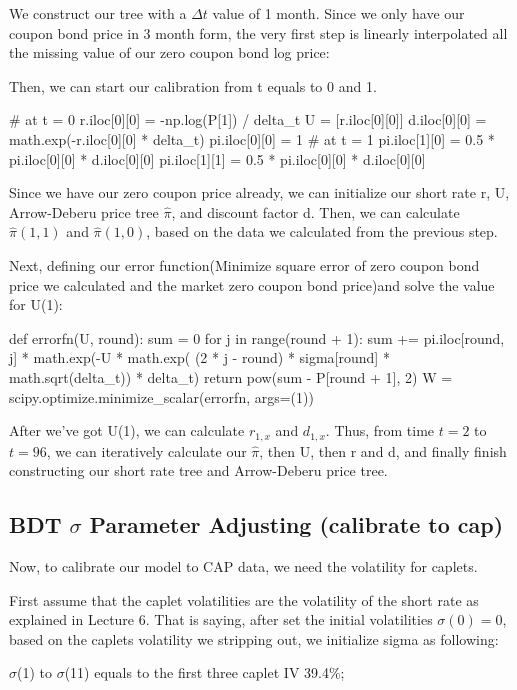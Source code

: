 \documentclass[paper = letterpaper, fontsize=12pt]{article}
\begin{document}
We construct our tree with a $\Delta t$ value of 1 month. Since we only have our coupon bond price in 3 month form, the very first step is linearly interpolated all the missing value of our zero coupon bond log price:
 

 Then, we can start our calibration from t equals to 0 and 1.
\begin{python}
# at t = 0
r.iloc[0][0] = -np.log(P[1]) / delta_t
U = [r.iloc[0][0]]
d.iloc[0][0] = math.exp(-r.iloc[0][0] * delta_t)
pi.iloc[0][0] = 1
# at t = 1
pi.iloc[1][0] = 0.5 * pi.iloc[0][0] * d.iloc[0][0]
pi.iloc[1][1] = 0.5 * pi.iloc[0][0] * d.iloc[0][0]
\end{python}

Since we have our zero coupon price already, we can initialize our short rate r, U, Arrow-Deberu price tree $\hat{\pi}$, and discount factor d. Then, we can calculate $\hat{\pi}(1,1)$ and $\hat{\pi}(1, 0)$, based on the data we calculated from the previous step. 

Next, defining our error function(Minimize square error of zero coupon bond price we calculated and the market zero coupon bond price)and solve the value for U(1):
\begin{python}
def errorfn(U, round):
    sum = 0
    for j in range(round + 1):
        sum += pi.iloc[round, j] * math.exp(-U * math.exp(
            (2 * j - round) * sigma[round] * math.sqrt(delta_t)) * delta_t)
    return pow(sum - P[round + 1], 2)
W = scipy.optimize.minimize_scalar(errorfn, args=(1))
\end{python}

After we’ve got U(1), we can calculate $r_{1,x}$ and $d_{1,x}$. Thus, from time $t = 2$ to $t = 96$, we can iteratively calculate our $\hat{\pi}$, then U, then r and d, and finally finish constructing our short rate tree and Arrow-Deberu price tree.

\subsection{BDT $\sigma$ Parameter Adjusting (calibrate to cap)}
Now, to calibrate our model to CAP data, we need the volatility for caplets.

First assume that the caplet volatilities are the volatility of the short rate as explained in Lecture 6.  That is saying, after set the initial volatilities $\sigma(0) = 0$, based on the caplets volatility we stripping out, we initialize sigma as following:

$\sigma$(1) to $\sigma$(11) equals to the first three caplet IV 39.4\%;
\end{document}
